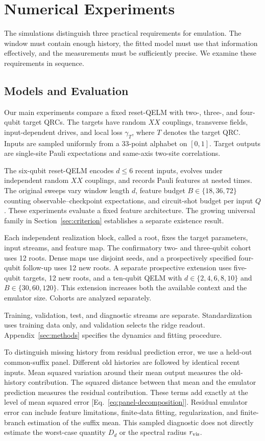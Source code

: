 \section{Numerical Experiments}
\label{sec:numerics}

The simulations distinguish three practical requirements for emulation.
The window must contain enough history, the fitted model must use that
information effectively, and the measurements must be sufficiently precise.
We examine these requirements in sequence.

\subsection{Models and Evaluation}

Our main experiments compare a fixed reset-QELM with two-, three-, and
four-qubit target QRCs. The targets have random $XX$ couplings, transverse
fields, input-dependent drives, and local loss $\gamma_T$, where $T$ denotes
the target QRC. Inputs are sampled uniformly from a 33-point alphabet on
$[0,1]$. Target outputs are single-site Pauli expectations and same-axis
two-site correlations.

The six-qubit reset-QELM encodes $d\leq6$ recent inputs, evolves under
independent random $XX$ couplings, and records Pauli features at nested times.
The original sweeps vary window length $d$, feature budget $B\in\{18,36,72\}$ counting
observable--checkpoint expectations, and circuit-shot budget per input $Q$.
These experiments evaluate a fixed feature architecture. The growing
universal family in Section~\ref{sec:criterion} establishes a separate
existence result.

Each independent realization block, called a root, fixes the target
parameters, input streams, and feature map. The confirmatory two- and
three-qubit cohort uses 12 roots. Dense maps use disjoint seeds, and a
prospectively specified four-qubit follow-up uses 12 new roots. A separate
prospective extension uses five-qubit targets, 12 new roots, and a ten-qubit
QELM with $d\in\{2,4,6,8,10\}$ and $B\in\{30,60,120\}$.
This extension increases both the available context and the emulator size.
Cohorts are analyzed separately.

Training, validation, test, and diagnostic streams are separate.
Standardization uses training data only, and validation selects the ridge
readout. Appendix~\ref{sec:methods} specifies the dynamics and fitting procedure.

To distinguish missing history from residual prediction error, we use a
held-out common-suffix panel. Different old histories are followed by
identical recent inputs. Mean squared variation around their mean output
measures the old-history contribution. The squared distance between that
mean and the emulator prediction measures the residual contribution.
These terms add exactly at the level of mean squared error
[Eq.~\eqref{eq:panel-decomposition}]. Residual emulator error can include
feature limitations, finite-data fitting, regularization, and finite-branch
estimation of the suffix mean. This sampled diagnostic does not directly
estimate the worst-case quantity $D_d$ or the spectral radius $r_{\rm vis}$.

